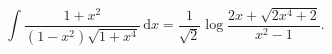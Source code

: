 %

\begin{problem}[pytanie 15719]
    \label{stack_15719}%
    \begin{equation}
        \int \frac{1 + x^2}{(1 - x^2) \sqrt{1 + x^4}} \,\mathrm{d}x = \frac{1}{\sqrt 2} \log \frac{2x + \sqrt{2x^4 + 2}}{x^2 - 1}.
    \end{equation}
\end{problem}

%